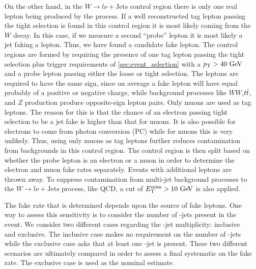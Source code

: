 On the other hand, in the 
$W\rightarrow l\nu + \textrm{Jets}$ control region there
is only one real lepton being produced by the process.
If a well reconstructed tag lepton passing the tight selection
is found in this control 
region it is most likely coming from the $W$ decay.
In this case, if we measure a second ``probe'' lepton it is most likely
a jet faking a lepton. Thus, we have found a candidate fake lepton.
The control regions are formed by requiring the presence
of one tag lepton passing the tight selection
plus trigger requirements
of \sec\ref{sec:event_selection} with a $\pt>40\GeV$ and 
a probe lepton passing either the loose or tight selection.
The leptons are required to have the same sign, since
on average a fake lepton will have equal probably of
a positive or negative charge, while background processes
like $WW$,$t\bar{t}$, and $Z$ production produce opposite-sign lepton
pairs.  Only muons are used as tag leptons. 
The reason for this is that the chance of an electron passing tight selection
to be a jet fake is higher than that for muons. It is also 
possible for electrons to come from photon conversion  (PC)
while for muons this is very unlikely. Thus, using only muons as tag
leptons further reduces contamination from backgrounds in this control
region. The control region is then split based on whether the probe
lepton is an electron or a muon in order to determine the electron
and muon fake rates separately.
Events with additional leptons are thrown away.
To suppress contamination from multi-jet background processes
to the $W\rightarrow l\nu + \textrm{Jets}$ process, like QCD,
a cut of $\met>10\GeV$ is also applied.

The fake rate that is determined depends upon the source of fake leptons.
One way to assess this sensitivity is to consider the number of
\bee-jets present in the event. We consider two different
cases regarding the \bee-jet multiplicity: inclusive and exclusive.
The inclusive case makes no requirement on the number of \bee-jets
while the exclusive case asks that at least one \bee-jet is present.
These two different scenarios are ultimately compared in order to assess
a final systematic on the fake rate. The exclusive case
is used as the nominal estimate.

